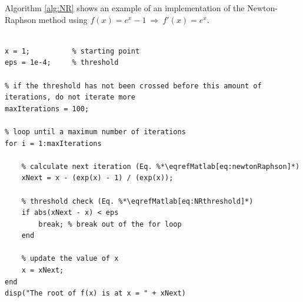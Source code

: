 Algorithm \ref{alg:NR} shows an example of an implementation of the Newton-Raphson method using $f(x) = e^x -1\ \Rightarrow\ f'(x) = e^x $.

\setlstMAT
\begin{lstlisting}[caption={Example of an implementation of the Newton-Raphson method using $f(x) = e^{x} - 1$.}, label=alg:NR]
% An example of the Newton Raphson method using f(x) = exp(x) - 1

x = 1;          % starting point
eps = 1e-4;     % threshold

% if the threshold has not been crossed before this amount of iterations, do not iterate more
maxIterations = 100;    
    
% loop until a maximum number of iterations
for i = 1:maxIterations

    % calculate next iteration (Eq. %*\eqrefMatlab[eq:newtonRaphson]*)
    xNext = x - (exp(x) - 1) / (exp(x));

    % threshold check (Eq. %*\eqrefMatlab[eq:NRthreshold]*)
    if abs(xNext - x) < eps 
        break; % break out of the for loop
    end

    % update the value of x
    x = xNext;
end
disp("The root of f(x) is at x = " + xNext)
\end{lstlisting}

